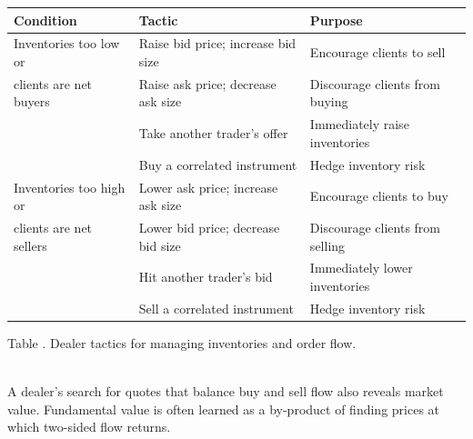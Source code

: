 \documentclass[a4paper,oneside,openany]{book}
\begin{document}
\begin{table}[htbp]
\centering
\scriptsize
{}
\renewcommand{\arraystretch}{1.13}
\setlength{\tabcolsep}{4pt}
\begin{tabularx}{\textwidth}{@{}>{\RaggedRight\arraybackslash}p{} >{\RaggedRight\arraybackslash}p{} >{\RaggedRight\arraybackslash}X@{}}
\hline
\textbf{Condition} & \textbf{Tactic} & \textbf{Purpose} \\
\hline
Inventories too low or & Raise bid price; increase bid size & Encourage clients to sell \\
clients are net buyers & Raise ask price; decrease ask size & Discourage clients from buying \\
& Take another trader's offer & Immediately raise inventories \\
& Buy a correlated instrument & Hedge inventory risk \\
\hline
Inventories too high or & Lower ask price; increase ask size & Encourage clients to buy \\
clients are net sellers & Lower bid price; decrease bid size & Discourage clients from selling \\
& Hit another trader's bid & Immediately lower inventories \\
& Sell a correlated instrument & Hedge inventory risk \\
\hline
\end{tabularx}

\vspace{0.25em}
{\footnotesize Table \thetable. Dealer tactics for managing inventories and order flow.}
\end{table}

\begin{principle} \\
A dealer's search for quotes that balance buy and sell flow also reveals market value. Fundamental value is often learned as a by-product of finding prices at which two-sided flow returns.
\end{principle}
\end{document}
